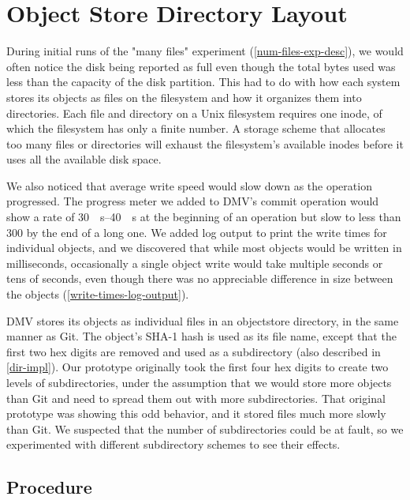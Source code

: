 \section{Object Store Directory Layout}
\label{dir-experiment}

During initial runs of the "many files" experiment
(\autoref{num-files-exp-desc}), we would often notice the disk being reported as
full even though the total bytes used was less than the capacity of the disk
partition. This had to do with how each system stores its objects as files on
the filesystem and how it organizes them into directories. Each file and
directory on a Unix filesystem requires one \gls{inode}, of which the filesystem
has only a finite number. A storage scheme that allocates too many files or
directories will exhaust the filesystem's available \glspl{inode} before it uses
all the available disk space.

We also noticed that average write speed would slow down as the operation
progressed. The progress meter we added to \gls{DMV}'s \gls{commit} operation
would show a rate of \SIrange{30}{40}{\mib\s} at the beginning of an operation
but slow to less than \SI{300}{\kib} by the end of a long one. We added log
output to print the write times for individual objects, and we discovered that
while most objects would be written in milliseconds, occasionally a single
object write would take multiple seconds or tens of seconds, even though there
was no appreciable difference in size between the objects
(\autoref{write-times-log-output}).

\gls{DMV} stores its objects as individual files in an \gls{objectstore}
directory, in the same manner as Git. The object's SHA-1 hash is used as its
file name, except that the first two hex digits are removed and used as a
subdirectory (also described in \autoref{dir-impl}). Our prototype originally
took the first four hex digits to create two levels of subdirectories, under the
assumption that we would store more objects than Git and need to spread them out
with more subdirectories. That original prototype was showing this odd behavior,
and it stored files much more slowly than Git. We suspected that the number of
subdirectories could be at fault, so we experimented with different subdirectory
schemes to see their effects.

%


\subsection{Procedure}

